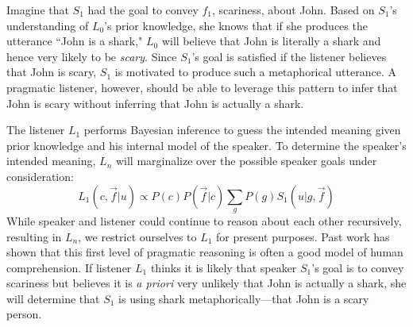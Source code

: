 \documentclass[10pt,letterpaper]{article}
\begin{document}
%

Imagine that $S_1$ had the goal to convey $f_1$, scariness, about John.
Based on $S_1$'s understanding of $L_0$'s prior knowledge, she knows that if she produces the utterance ``John is a shark," $L_0$ will believe that John is literally a shark and hence very likely to be \emph{scary}. Since $S_1$'s goal is satisfied if the listener believes that John is scary, $S_1$ is motivated to produce such a metaphorical utterance. A pragmatic listener, however, should be able to leverage this pattern to infer that John is scary without inferring that John is actually a shark.


The listener $L_1$ performs Bayesian inference to guess the intended meaning given prior knowledge and his internal model of the speaker. To determine the speaker's intended meaning, $L_n$ will marginalize over the possible speaker goals under consideration:
$$
L_1 (c, \vec f | u) \propto P(c) P(\vec f | c) \sum_{g}{P (g) S_1 (u|g, \vec f)}
$$
While speaker and listener could continue to reason about each other recursively, resulting in $L_n$, we restrict ourselves to $L_1$ for present purposes. Past work has shown that this first level of pragmatic reasoning is often a good model of human comprehension.
If listener $L_1$ thinks it is likely that speaker $S_1$'s goal is to convey scariness but believes it is \emph{a priori} very unlikely that John is actually a shark, she will determine that $S_1$ is using shark metaphorically---that John is a scary person.
\end{document}
